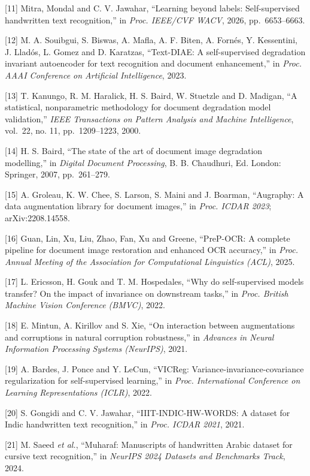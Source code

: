 \documentclass[
  12pt,
  a4paper,
]{report}
\begin{document}
{[}11{]} Mitra, Mondal and C. V. Jawahar, ``Learning beyond labels:
Self-supervised handwritten text recognition,'' in \emph{Proc. IEEE/CVF
WACV}, 2026, pp.~6653--6663.

{[}12{]} M. A. Souibgui, S. Biswas, A. Mafla, A. F. Biten, A. Fornés, Y.
Kessentini, J. Lladós, L. Gomez and D. Karatzas, ``Text-DIAE: A
self-supervised degradation invariant autoencoder for text recognition
and document enhancement,'' in \emph{Proc. AAAI Conference on Artificial
Intelligence}, 2023.

{[}13{]} T. Kanungo, R. M. Haralick, H. S. Baird, W. Stuetzle and D.
Madigan, ``A statistical, nonparametric methodology for document
degradation model validation,'' \emph{IEEE Transactions on Pattern
Analysis and Machine Intelligence}, vol.~22, no. 11, pp.~1209--1223,
2000.

{[}14{]} H. S. Baird, ``The state of the art of document image
degradation modelling,'' in \emph{Digital Document Processing}, B. B.
Chaudhuri, Ed. London: Springer, 2007, pp.~261--279.

{[}15{]} A. Groleau, K. W. Chee, S. Larson, S. Maini and J. Boarman,
``Augraphy: A data augmentation library for document images,'' in
\emph{Proc. ICDAR 2023}; arXiv:2208.14558.

{[}16{]} Guan, Lin, Xu, Liu, Zhao, Fan, Xu and Greene, ``PreP-OCR: A
complete pipeline for document image restoration and enhanced OCR
accuracy,'' in \emph{Proc. Annual Meeting of the Association for
Computational Linguistics (ACL)}, 2025.

{[}17{]} L. Ericsson, H. Gouk and T. M. Hospedales, ``Why do
self-supervised models transfer? On the impact of invariance on
downstream tasks,'' in \emph{Proc. British Machine Vision Conference
(BMVC)}, 2022.

{[}18{]} E. Mintun, A. Kirillov and S. Xie, ``On interaction between
augmentations and corruptions in natural corruption robustness,'' in
\emph{Advances in Neural Information Processing Systems (NeurIPS)},
2021.

{[}19{]} A. Bardes, J. Ponce and Y. LeCun, ``VICReg:
Variance-invariance-covariance regularization for self-supervised
learning,'' in \emph{Proc. International Conference on Learning
Representations (ICLR)}, 2022.

{[}20{]} S. Gongidi and C. V. Jawahar, ``IIIT-INDIC-HW-WORDS: A dataset
for Indic handwritten text recognition,'' in \emph{Proc. ICDAR 2021},
2021.

{[}21{]} M. Saeed \emph{et al.}, ``Muharaf: Manuscripts of handwritten
Arabic dataset for cursive text recognition,'' in \emph{NeurIPS 2024
Datasets and Benchmarks Track}, 2024.
\end{document}
